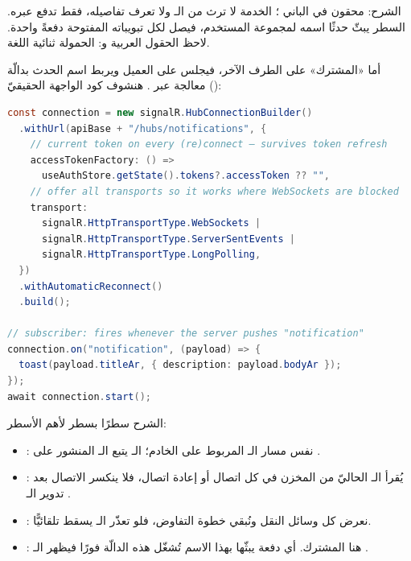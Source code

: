 الشرح:  محقون في الباني ؛
الخدمة لا ترث من الـ  ولا تعرف تفاصيله، فقط تدفع عبره. السطر
 يبثّ حدثًا
اسمه  لمجموعة المستخدم، فيصل لكل تبويباته المفتوحة دفعةً
واحدة. لاحظ الحقول العربية  و: الحمولة ثنائية اللغة.

أما «المشترك» على الطرف الآخر، فيجلس على العميل ويربط اسم الحدث بدالّة معالجة عبر
. هنشوف كود الواجهة الحقيقيّ ():

\begin{english}
\begin{lstlisting}[language=Java]
const connection = new signalR.HubConnectionBuilder()
  .withUrl(apiBase + "/hubs/notifications", {
    // current token on every (re)connect — survives token refresh
    accessTokenFactory: () =>
      useAuthStore.getState().tokens?.accessToken ?? "",
    // offer all transports so it works where WebSockets are blocked
    transport:
      signalR.HttpTransportType.WebSockets |
      signalR.HttpTransportType.ServerSentEvents |
      signalR.HttpTransportType.LongPolling,
  })
  .withAutomaticReconnect()
  .build();

// subscriber: fires whenever the server pushes "notification"
connection.on("notification", (payload) => {
  toast(payload.titleAr, { description: payload.bodyAr });
});
await connection.start();
\end{lstlisting}
\end{english}

الشرح سطرًا بسطر لأهم الأسطر:
\begin{itemize}
\item {}: نفس مسار الـ 
  المربوط على الخادم؛ الـ  يتبع الـ  المنشور على .
\item {}: يُقرأ الـ  الحاليّ من المخزن في كل
  اتصال أو إعادة اتصال، فلا ينكسر الاتصال بعد تدوير الـ .
\item {}: نعرض كل
  وسائل النقل ونُبقي خطوة التفاوض، فلو تعذّر الـ  يسقط تلقائيًّا.
\item {}: هنا المشترك. أي دفعة يبثّها
   بهذا الاسم تُشغّل هذه الدالّة فورًا فيظهر الـ
  .
\end{itemize}

